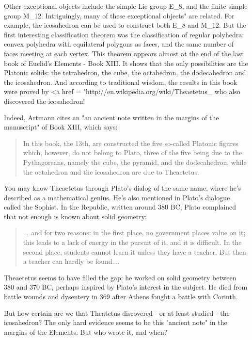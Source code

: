 Other exceptional objects include the simple Lie group E_{8},
and the finite simple group M_{12}.  Intriguingly, many of
these exceptional objects" are related.  For example, the
icosahedron can be used to construct both E_{8} and
M_{12}.  But the first interesting classification theorem was
the classification of regular polyhedra: convex polyhedra with
equilateral polygons as faces, and the same number of faces meeting at
each vertex.  This theorem appears almost at the end of the last book
of Euclid's Elements - Book XIII.  It shows that the only
possibilities are the Platonic solids: the tetrahedron, the cube, the
octahedron, the dodecahedron and the icosahedron. And according to
traditional wisdom, the results in this book were proved by <a href = "http://en.wikipedia.org/wiki/Theaetetus_%
who also discovered the icosahedron!

Indeed, Artmann cites an "an ancient note written in the margins of
the manuscript" of Book XIII, which says:

\begin{quote}
  In this book, the 13th, are constructed the five so-called Platonic 
  figures which, however, do not belong to Plato, three of the five 
  being due to the Pythagoreans, namely the cube, the pyramid, and 
  the dodecahedron, while the octahedron and the icosahedron are due 
  to Theaetetus. 
\end{quote}

You may know Theaetetus through Plato's dialog of the same name, where 
he's described as a mathematical genius.  He's also mentioned in 
Plato's dialogue called the Sophist.  In the Republic, written around 
380 BC, Plato complained that not enough is known about solid geometry:

\begin{quote}
  ... and for two reasons: in the first place, no government places 
  value on it; this leads to a lack of energy in the pursuit of it, 
  and it is difficult.  In the second place, students cannot learn it 
  unless they have a teacher.  But then a teacher can hardly be 
  found....
\end{quote}

Theaetetus seems to have filled the gap: he worked on solid geometry
between 380 and 370 BC, perhaps inspired by Plato's interest in the 
subject.  He died from battle wounds and dysentery in 369 after Athens
fought a battle with Corinth.

But how certain are we that Theatetus discovered - or at least studied -
the icosahedron?   The only hard evidence seems to be this "ancient 
note" in the margins of the Elements.  But who wrote it, and when?

